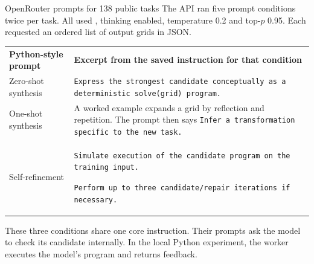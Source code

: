 \begingroup
\renewcommand{\sectiontag}{Backup\quad Historical OpenRouter prompts}
\renewcommand{\readurl}{run:proposals-backup/openrouter/full-prompts.pdf}
\renewcommand{\readsource}{Full saved prompts (supplement)}
\begin{frame}[t]{OpenRouter prompts for 138 public tasks}
\med
The API ran five prompt conditions twice per task. All used ,
thinking enabled, temperature 0.2 and top-$p$ 0.95. Each requested an ordered list
of output grids in JSON.
\vspace{4mm}

\begin{tabular}{@{}>{\raggedright\arraybackslash}p{49mm}>{\raggedright\arraybackslash}p{157mm}@{}}
\textbf{Python-style prompt} & \textbf{Excerpt from the saved instruction for that condition}\\[2mm]
Zero-shot synthesis & \texttt{Express the strongest candidate conceptually as a deterministic solve(grid) program.}\\[3mm]
One-shot synthesis & A worked example expands a grid by reflection and repetition. The prompt then says \texttt{Infer a transformation specific to the new task.}\\[3mm]
Self-refinement & \texttt{Simulate execution of the candidate program on the training input.}\par
\texttt{Perform up to three candidate/repair iterations if necessary.}\\
\end{tabular}
\vfill
\smallbody
These three conditions share one core instruction. Their prompts ask the model to check its candidate internally.
In the local Python experiment, the worker executes the model's program and returns feedback.
\end{frame}

